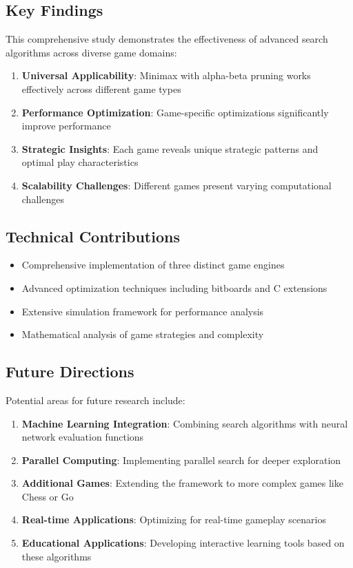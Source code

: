 \documentclass[12pt]{article}
\begin{document}
\subsection{Key Findings}

This comprehensive study demonstrates the effectiveness of advanced search algorithms across diverse game domains:

\begin{enumerate}
    \item \textbf{Universal Applicability}: Minimax with alpha-beta pruning works effectively across different game types
    \item \textbf{Performance Optimization}: Game-specific optimizations significantly improve performance
    \item \textbf{Strategic Insights}: Each game reveals unique strategic patterns and optimal play characteristics
    \item \textbf{Scalability Challenges}: Different games present varying computational challenges
\end{enumerate}

\subsection{Technical Contributions}

\begin{itemize}
    \item Comprehensive implementation of three distinct game engines
    \item Advanced optimization techniques including bitboards and C extensions
    \item Extensive simulation framework for performance analysis
    \item Mathematical analysis of game strategies and complexity
\end{itemize}

\subsection{Future Directions}

Potential areas for future research include:

\begin{enumerate}
    \item \textbf{Machine Learning Integration}: Combining search algorithms with neural network evaluation functions
    \item \textbf{Parallel Computing}: Implementing parallel search for deeper exploration
    \item \textbf{Additional Games}: Extending the framework to more complex games like Chess or Go
    \item \textbf{Real-time Applications}: Optimizing for real-time gameplay scenarios
    \item \textbf{Educational Applications}: Developing interactive learning tools based on these algorithms
\end{enumerate}
\end{document}
